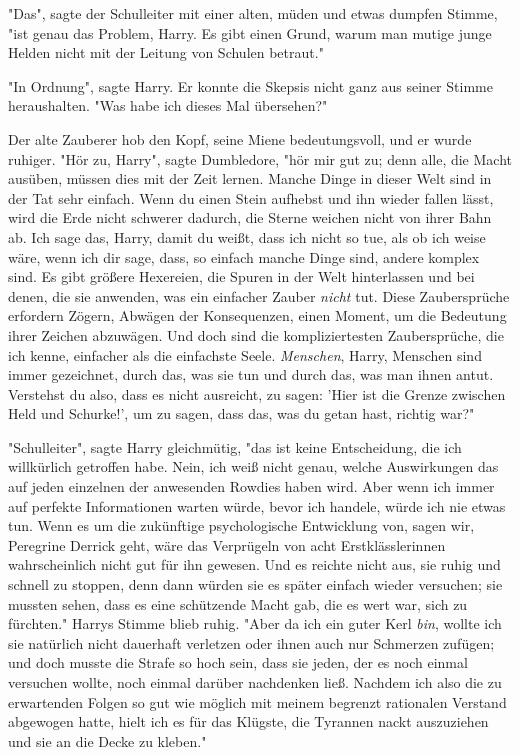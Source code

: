 {"Das", sagte der Schulleiter mit einer alten, müden und etwas dumpfen Stimme, "ist genau das Problem, Harry. Es gibt einen Grund, warum man mutige junge Helden nicht mit der Leitung von Schulen betraut."

"In Ordnung", sagte Harry. Er konnte die Skepsis nicht ganz aus seiner Stimme heraushalten. "Was habe ich dieses Mal übersehen?"

Der alte Zauberer hob den Kopf, seine Miene bedeutungsvoll, und er wurde ruhiger. "Hör zu, Harry", sagte Dumbledore, "hör mir gut zu; denn alle, die Macht ausüben, müssen dies mit der Zeit lernen. Manche Dinge in dieser Welt sind in der Tat sehr einfach. Wenn du einen Stein aufhebst und ihn wieder fallen lässt, wird die Erde nicht schwerer dadurch, die Sterne weichen nicht von ihrer Bahn ab. Ich sage das, Harry, damit du weißt, dass ich nicht so tue, als ob ich weise wäre, wenn ich dir sage, dass, so einfach manche Dinge sind, andere komplex sind. Es gibt größere Hexereien, die Spuren in der Welt hinterlassen und bei denen, die sie anwenden, was ein einfacher Zauber \emph{nicht} tut. Diese Zaubersprüche erfordern Zögern, Abwägen der Konsequenzen, einen Moment, um die Bedeutung ihrer Zeichen abzuwägen. Und doch sind die kompliziertesten Zaubersprüche, die ich kenne, einfacher als die einfachste Seele. \emph{Menschen}, Harry, Menschen sind immer gezeichnet, durch das, was sie tun und durch das, was man ihnen antut. Verstehst du also, dass es nicht ausreicht, zu sagen: 'Hier ist die Grenze zwischen Held und Schurke!', um zu sagen, dass das, was du getan hast, richtig war?"

"Schulleiter", sagte Harry gleichmütig, "das ist keine Entscheidung, die ich willkürlich getroffen habe. Nein, ich weiß nicht genau, welche Auswirkungen das auf jeden einzelnen der anwesenden Rowdies haben wird. Aber wenn ich immer auf perfekte Informationen warten würde, bevor ich handele, würde ich nie etwas tun. Wenn es um die zukünftige psychologische Entwicklung von, sagen wir, Peregrine Derrick geht, wäre das Verprügeln von acht Erstklässlerinnen wahrscheinlich nicht gut für ihn gewesen. Und es reichte nicht aus, sie ruhig und schnell zu stoppen, denn dann würden sie es später einfach wieder versuchen; sie mussten sehen, dass es eine schützende Macht gab, die es wert war, sich zu fürchten." Harrys Stimme blieb ruhig. "Aber da ich ein guter Kerl \emph{bin}, wollte ich sie natürlich nicht dauerhaft verletzen oder ihnen auch nur Schmerzen zufügen; und doch musste die Strafe so hoch sein, dass sie jeden, der es noch einmal versuchen wollte, noch einmal darüber nachdenken ließ. Nachdem ich also die zu erwartenden Folgen so gut wie möglich mit meinem begrenzt rationalen Verstand abgewogen hatte, hielt ich es für das Klügste, die Tyrannen nackt auszuziehen und sie an die Decke zu kleben."

}
